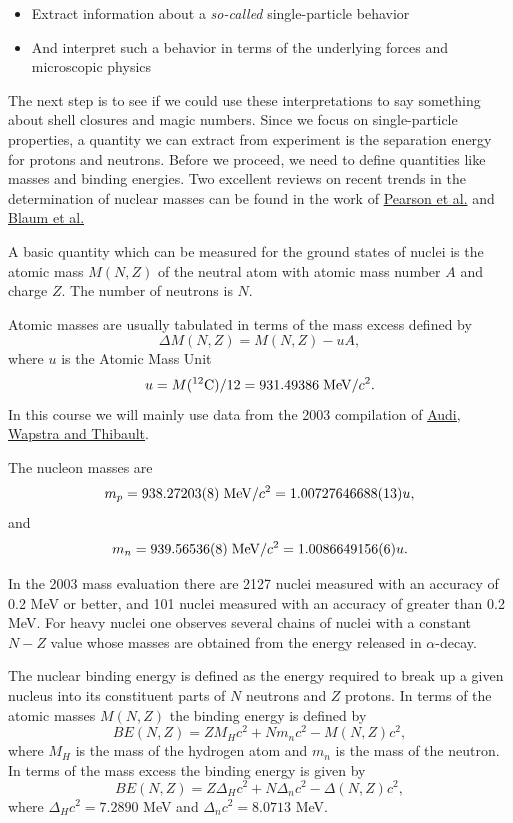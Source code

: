 \documentclass[%
twoside,                 %
final,                   %
10pt]{article}
\begin{document}
\begin{itemize}
\item Extract information about a \emph{so-called} single-particle  behavior

\item And interpret such a behavior in terms of the underlying forces and microscopic physics
\end{itemize}

\noindent
The next step is to see if we could use these interpretations to say something about shell closures and magic numbers. Since we focus on single-particle properties, a quantity we can extract from experiment is the separation energy for protons and neutrons. Before we proceed, we need to define quantities like masses and binding energies.   Two excellent reviews on 
recent trends in the determination of nuclear masses can be found in the work of \href{{http://journals.aps.org/rmp/abstract/10.1103/RevModPhys.75.1021}}{Pearson et al.} and \href{{http://iopscience.iop.org/1402-4896/2013/T152/014017/}}{Blaum et al.}


A basic quantity which can be measured for the ground states of nuclei is the atomic mass $M(N, Z)$ of the neutral atom with atomic mass number $A$ and charge $Z$. The number of neutrons is $N$.

Atomic masses are usually tabulated in terms of the mass excess defined by
\[
\Delta M(N, Z) =  M(N, Z) - uA,
\]
where $u$ is the Atomic Mass Unit 
\[
u = M(^{12}\mathrm{C})/12 = 931.49386 \hspace{0.1cm} \mathrm{MeV}/c^2.
\]
In this course we will mainly use 
data from the 2003 compilation of \href{{http://www.sciencedirect.com/science/journal/03759474/729/1}}{Audi, Wapstra and Thibault}.


The nucleon masses are
\[
m_p = 938.27203(8)\hspace{0.1cm} \mathrm{MeV}/c^2 = 1.00727646688(13)u,
\] 
and
\[
m_n = 939.56536(8)\hspace{0.1cm} \mathrm{MeV}/c^2 = 1.0086649156(6)u.
\]

In the 2003 mass evaluation there are 2127 nuclei measured with an accuracy of 0.2
MeV or better, and 101 nuclei measured with an accuracy of greater than 0.2 MeV. For
heavy nuclei one observes several chains of nuclei with a constant $N-Z$ value whose masses are obtained from the energy released in $\alpha$-decay.


The nuclear binding energy is defined as the energy required to break up a given nucleus
into its constituent parts of $N$ neutrons and $Z$ protons. In terms of the atomic masses $M(N, Z)$ the binding energy is defined by
\[
BE(N, Z) = ZM_H c^2 + Nm_n c^2 - M(N, Z)c^2 ,
\]
where $M_H$ is the mass of the hydrogen atom and $m_n$ is the mass of the neutron.
In terms of the mass excess the binding energy is given by
\[
BE(N, Z) = Z\Delta_H c^2 + N\Delta_n c^2 -\Delta(N, Z)c^2 ,
\]
where $\Delta_H c^2 = 7.2890$ MeV and $\Delta_n c^2 = 8.0713$ MeV.
\end{document}
